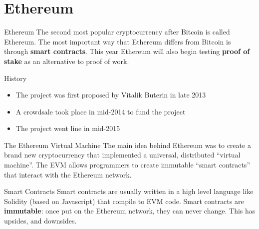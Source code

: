\documentclass[14pt]{beamer}
\begin{document}
\section{Ethereum}

\begin{frame}{Ethereum}
  The second most popular cryptocurrency after Bitcoin is called Ethereum.
  \newline
  \newline
  The most important way that Ethereum differs from Bitcoin is through
  \textbf{smart contracts}.
  \newline
  \newline
  This year Ethereum will also begin testing \textbf{proof of stake} as an
  alternative to proof of work.
\end{frame}

\begin{frame}{History}
  \begin{itemize}
  \item The project was first proposed by Vitalik Buterin in late 2013
  \item A crowdsale took place in mid-2014 to fund the project
  \item The project went line in mid-2015
  \end{itemize}
\end{frame}

\begin{frame}{The Ethereum Virtual Machine}
  The main idea behind Ethereum was to create a brand new cryptocurrency that
  implemented a universal, distributed ``virtual machine''.
  \newline
  \newline
  The EVM allows programmers to create immutable ``smart contracts'' that
  interact with the Ethereum network.
\end{frame}

\begin{frame}{Smart Contracts}
  Smart contracts are usually written in a high level language like Solidity
  (based on Javascript) that compile to EVM code.
  \newline
  \newline
  Smart contracts are \textbf{immutable}: once put on the Ethereum network, they
  can never change. This has upsides, and downsides.
\end{frame}
\end{document}
